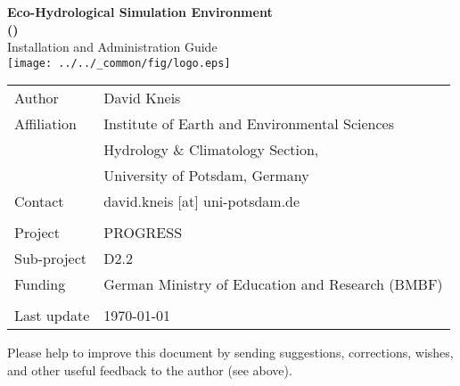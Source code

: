 \documentclass[a4paper,twocolumn,10pt,fleqn]{book}
\begin{document}

\pagestyle{empty}
\onecolumn

\begin{center}
  \vspace*{5cm}
  \LARGE
  \textbf{Eco-Hydrological Simulation Environment \\ ()} \\
  \vspace*{1.2cm}
  Installation and Administration Guide \\
  \vspace*{2.0cm}
  \texttt{[image: ../../\_common/fig/logo.eps]}
\end{center}

\cleardoublepage

\vspace*{12cm}
\begin{tabular}{ll}
Author      & David Kneis \\
Affiliation & Institute of Earth and Environmental Sciences \\
            & Hydrology \& Climatology Section, \\
            & University of Potsdam, Germany \\
Contact     & david.kneis [at] uni-potsdam.de \\
            & \\
Project     & PROGRESS \\
Sub-project & D2.2 \\
Funding     & German Ministry of Education and Research (BMBF) \\
            & \\
Last update & \today{} \\
\end{tabular}

\vspace*{2.0cm}
\noindent Please help to improve this document by sending suggestions, corrections, wishes, and other useful feedback to the author (see above).

\cleardoublepage

\end{document}
